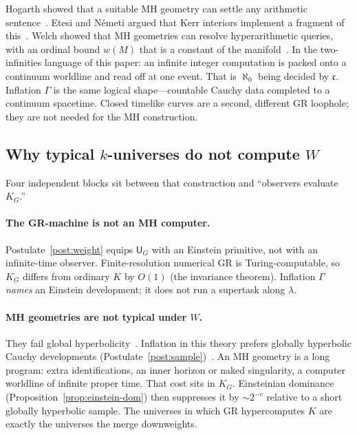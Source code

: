 \documentclass[11pt,a4paper]{article}
\theoremstyle{plain}
\theoremstyle{definition}
\theoremstyle{remark}
\newcommand{\alef}{\aleph_{0}}
\newcommand{\cont}{\mathfrak{c}}
\newcommand{\KG}{K_{G}}
\newcommand{\UTM}{\mathsf{U}_{G}}
\begin{document}
Hogarth showed that a suitable MH geometry can settle any arithmetic sentence~\cite{hogarth2004}.
Etesi and N\'emeti argued that Kerr interiors implement a fragment of this~\cite{etesi2002,nemeti2006}.
Welch showed that MH geometries can resolve hyperarithmetic queries, with an ordinal bound $w(M)$ that is a constant of the manifold~\cite{welch2008}.
In the two-infinities language of this paper: an infinite integer computation is packed onto a continuum worldline and read off at one event.
That is $\alef$ being decided by $\cont$.
Inflation $\Gamma$ is the same logical shape---countable Cauchy data completed to a continuum spacetime.
Closed timelike curves are a second, different GR loophole; they are not needed for the MH construction.

\subsection{Why typical $k$-universes do not compute $W$}

Four independent blocks sit between that construction and ``observers evaluate $\KG$.''

\paragraph{The GR-machine is not an MH computer.}
Postulate~\ref{post:weight} equips $\UTM$ with an Einstein primitive, not with an infinite-time observer.
Finite-resolution numerical GR is Turing-computable, so $\KG$ differs from ordinary $K$ by $O(1)$ (the invariance theorem).
Inflation $\Gamma$ \emph{names} an Einstein development; it does not run a supertask along $\lambda$.

\paragraph{MH geometries are not typical under $W$.}
They fail global hyperbolicity~\cite{hogarth2004,earman1993}.
Inflation in this theory prefers globally hyperbolic Cauchy developments (Postulate~\ref{post:sample})~\cite{choquetbruhat1952}.
An MH geometry is a long program: extra identifications, an inner horizon or naked singularity, a computer worldline of infinite proper time.
That cost sits in $\KG$.
Einsteinian dominance (Proposition~\ref{prop:einstein-dom}) then suppresses it by $\sim 2^{-c}$ relative to a short globally hyperbolic sample.
The universes in which GR hypercomputes $K$ are exactly the universes the merge downweights.
\end{document}
